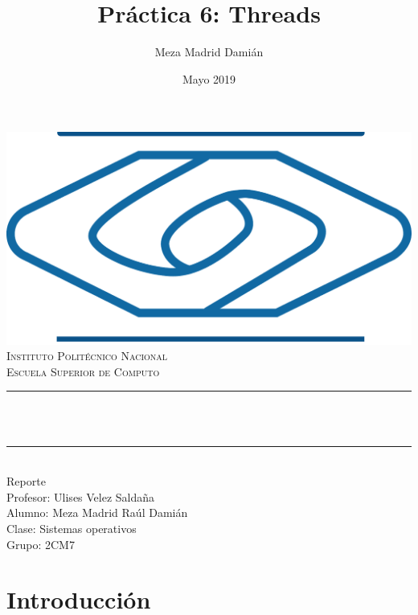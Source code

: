 \documentclass[12pt]{article}
\title{Práctica 6: Threads}%
\author{Meza Madrid Damián}%
\date{Mayo 2019}%
\makeatletter
\let\thetitle\@title
\makeatother
\begin{document}

\begin{titlepage}
	\centering
    \vspace*{0.5 cm}
    \includegraphics[scale = 0.30]{escom.png}\\[1.0 cm]	%
	\textsc{\Large Instituto Politécnico Nacional}\\[0.5 cm]%
	\textsc{\Large Escuela Superior de Computo}\\[0.5 cm]%
	\rule{\linewidth}{0.2 mm} \\[0.4 cm]
	{ \huge \bfseries \thetitle}\\
	\rule{\linewidth}{0.2 mm} \\[1.5 cm]
	Reporte\\
	Profesor: Ulises Velez Saldaña \\
	Alumno: Meza Madrid Raúl Damián\\
    Clase: Sistemas operativos\\
    Grupo: 2CM7\\
\end{titlepage}
\tableofcontents
\pagebreak
\section{Introducción}
\end{document}
